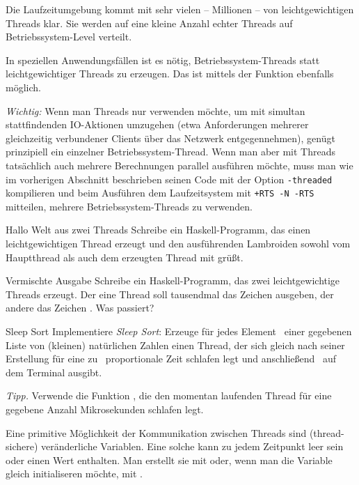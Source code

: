 \documentclass{uebblatt}
\begin{document}
Die Laufzeitumgebung kommt mit sehr vielen -- Millionen -- von
leichtgewichtigen Threads klar. Sie werden auf eine kleine Anzahl
echter Threads auf Betriebssystem-Level verteilt.

In speziellen Anwendungsfällen ist es nötig, Betriebssystem-Threads statt
leichtgewichtiger Threads zu erzeugen. Das ist mittels der Funktion
 ebenfalls möglich.

\emph{Wichtig:} Wenn man Threads nur verwenden möchte, um mit simultan
stattfindenden IO-Aktionen umzugehen (etwa Anforderungen mehrerer gleichzeitig
verbundener Clients über das Netzwerk entgegennehmen), genügt prinzipiell ein
einzelner Betriebssystem-Thread. Wenn man aber mit Threads
tatsächlich auch mehrere Berechnungen parallel ausführen möchte, muss man
wie im vorherigen Abschnitt beschrieben seinen Code mit der Option
\texttt{-threaded} kompilieren und beim Ausführen
dem Laufzeitsystem mit \texttt{+RTS -N -RTS} mitteilen, mehrere
Betriebssystem-Threads zu verwenden.

\begin{aufgabe}{Hallo Welt aus zwei Threads}
Schreibe ein Haskell-Programm, das einen leichtgewichtigen Thread erzeugt
und den ausführenden Lambroiden sowohl vom Hauptthread als auch dem erzeugten
Thread mit  grüßt.
\end{aufgabe}

\begin{aufgabe}{Vermischte Ausgabe}
Schreibe ein Haskell-Programm, das zwei leichtgewichtige Threads erzeugt. Der
eine Thread soll tausendmal das Zeichen  ausgeben, der
andere das Zeichen . Was passiert?
\end{aufgabe}

\begin{aufgabe}{Sleep Sort}
Implementiere \emph{Sleep Sort}: Erzeuge für jedes
Element~ einer gegebenen Liste von (kleinen) natürlichen
Zahlen einen Thread, der sich gleich nach seiner Erstellung für eine
zu~ proportionale Zeit schlafen legt und
anschließend~ auf dem Terminal ausgibt.

{\scriptsize\emph{Tipp.} Verwende die Funktion , die den momentan laufenden Thread für eine gegebene Anzahl
Mikrosekunden schlafen legt.\par}
\end{aufgabe}

Eine primitive Möglichkeit der Kommunikation zwischen Threads sind
(thread-sichere) veränderliche Variablen. Eine solche kann zu jedem Zeitpunkt
leer sein oder einen Wert enthalten. Man erstellt sie mit
 oder, wenn man die Variable gleich
initialiseren möchte, mit .
\end{document}
